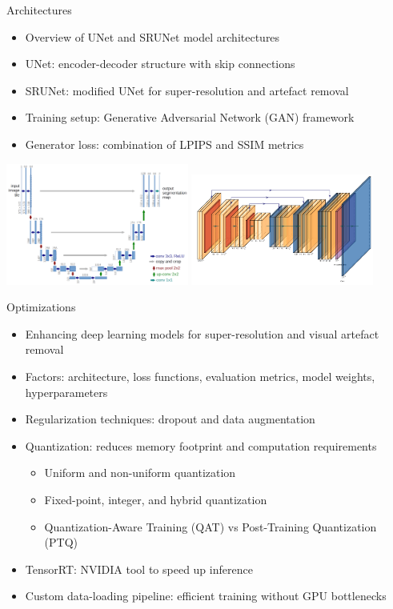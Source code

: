 \documentclass{beamer}
\begin{document}
\begin{frame}{Architectures}
\begin{itemize}
  \item Overview of UNet and SRUNet model architectures
  \item UNet: encoder-decoder structure with skip connections
  \item SRUNet: modified UNet for super-resolution and artefact removal
  \item Training setup: Generative Adversarial Network (GAN) framework
  \item Generator loss: combination of LPIPS and SSIM metrics
\end{itemize}
\includegraphics[width=0.45\textwidth]{../thesis/static/unet_architecture.png}
\includegraphics[width=0.45\textwidth]{../thesis/static/srunet_architecture.png}
\end{frame}
\begin{frame}{Optimizations}
\begin{itemize}
  \item Enhancing deep learning models for super-resolution and visual artefact removal
  \item Factors: architecture, loss functions, evaluation metrics, model weights, hyperparameters
  \item Regularization techniques: dropout and data augmentation
  \item Quantization: reduces memory footprint and computation requirements
  \begin{itemize}
    \item Uniform and non-uniform quantization
    \item Fixed-point, integer, and hybrid quantization
    \item Quantization-Aware Training (QAT) vs Post-Training Quantization (PTQ)
  \end{itemize}
  \item TensorRT: NVIDIA tool to speed up inference
  \item Custom data-loading pipeline: efficient training without GPU bottlenecks
\end{itemize}
\end{frame}
\end{document}
